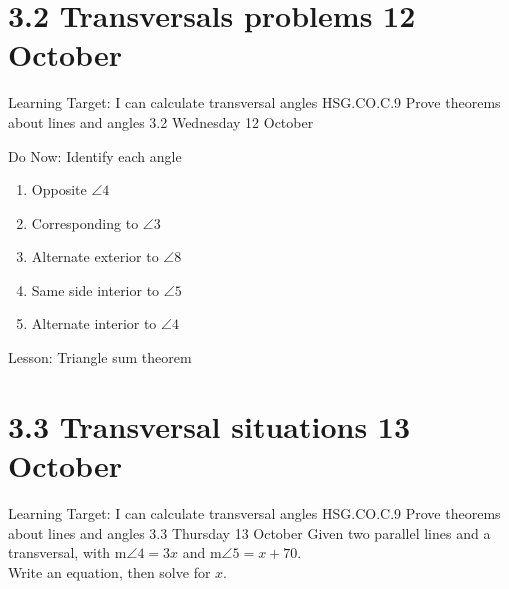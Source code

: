 \section{3.2 Transversals problems \hfill 12 October}
\begin{frame}{Learning Target: I can calculate transversal angles}
  {HSG.CO.C.9 Prove theorems about lines and angles  \hfill \alert{3.2 Wednesday 12 October}}
  \begin{block}{Do Now: Identify each angle}
    \begin{multicols}{2}
    \begin{enumerate}
      \item Opposite $\angle 4$
      \item Corresponding to $\angle 3$
      \item Alternate exterior to $\angle 8$
      \item Same side interior to $\angle 5$
      \item Alternate interior to $\angle 4$
  \end{enumerate}
  \begin{center}
  \end{center}
\end{multicols}
\end{block}
Lesson: Triangle sum theorem
\end{frame}

\section{3.3 Transversal situations \hfill 13 October}
\begin{frame}{Learning Target: I can calculate transversal angles}
  {HSG.CO.C.9 Prove theorems about lines and angles  \hfill \alert{3.3 Thursday 13 October}}
  Given two parallel lines and a transversal, with m$\angle 4 = 3x$ and m$\angle 5 = x + 70$. \\ Write an equation, then solve for $x$.
  \begin{flushright}
  \end{flushright}
\end{frame}

